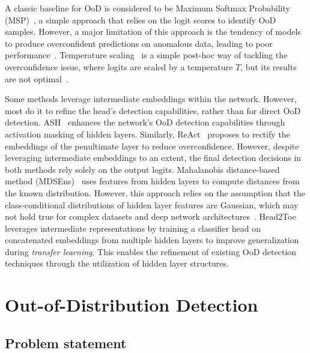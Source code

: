 \documentclass[10pt,twocolumn,a4paper]{article}
\newcommand{\minisection}[1]{\vspace{0.03in} \noindent {\bf #1}}
\begin{document}
\minisection{Baselines.}
A classic baseline for OoD is considered to be Maximum Softmax Probability (MSP)~\cite{hendrycks2018baseline}, a simple approach that relies on the logit scores to identify OoD samples. However, a major limitation of this approach is the tendency of models to produce overconfident predictions on anomalous data, leading to poor performance~\cite{guo2017calibration}. Temperature scaling~\cite{guo2017calibration} is a simple post-hoc way of tackling the overconfidence issue, where logits are scaled by a temperature $T$, but its results are not optimal~\cite{zhang2024openood}.

\minisection{OoD and intermediate layers.}
Some methods leverage intermediate embeddings within the network. However, most do it to refine the head's detection capabilities, rather than for direct OoD detection. ASH~\cite{djurisic2023extremely} enhances the network's OoD detection capabilities through activation masking of hidden layers. Similarly, ReAct~\cite{sun2021react} proposes to rectify the embeddings of the penultimate layer to reduce overconfidence. However, despite leveraging intermediate embeddings to an extent, the final detection decisions in both methods rely solely on the output logits. Mahalanobis distance-based method (MDSEns)~\cite{lee2018simple} uses features from hidden layers to compute distances from the known distribution. However, this approach relies on the assumption that the class-conditional distributions of hidden layer features are Gaussian, which may not hold true for complex datasets and deep network architectures~\cite{venkataramanan2023gaussian}. Head2Toe~\cite{evci2022head2toe} leverages intermediate representations by training a classifier head on concatenated embeddings from multiple hidden layers to improve generalization during \textit{transfer learning}. This enables the refinement of existing OoD detection techniques through the utilization of hidden layer structures.

\section{Out-of-Distribution Detection}\label{sec:prelim}

\subsection{Problem statement}\label{sec:prob_stat}
\end{document}
